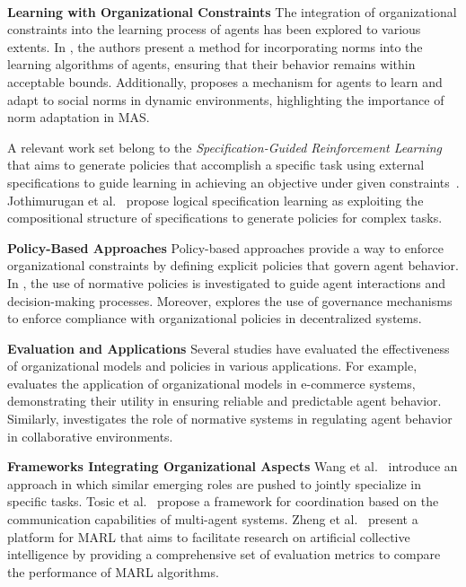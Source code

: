 \documentclass[conference]{IEEEtran}
\begin{document}
\

\textbf{Learning with Organizational Constraints} \quad
%
The integration of organizational constraints into the learning process of agents has been explored to various extents. In \cite{cruz2020norms}, the authors present a method for incorporating norms into the learning algorithms of agents, ensuring that their behavior remains within acceptable bounds. Additionally, \cite{villatoro2011social} proposes a mechanism for agents to learn and adapt to social norms in dynamic environments, highlighting the importance of norm adaptation in MAS.

A relevant work set belong to the \emph{Specification-Guided Reinforcement Learning} that aims to generate policies that accomplish a specific task using external specifications to guide learning in achieving an objective under given constraints~\cite{Bansal2022}. Jothimurugan et al.~\cite{Jothimurugan2021} propose logical specification learning as exploiting the compositional structure of specifications to generate policies for complex tasks.

\textbf{Policy-Based Approaches} \quad
%
Policy-based approaches provide a way to enforce organizational constraints by defining explicit policies that govern agent behavior. In \cite{krupanski2015norm}, the use of normative policies is investigated to guide agent interactions and decision-making processes. Moreover, \cite{vos2020governing} explores the use of governance mechanisms to enforce compliance with organizational policies in decentralized systems.

\textbf{Evaluation and Applications} \quad
%
Several studies have evaluated the effectiveness of organizational models and policies in various applications. For example, \cite{dignum2004agent} evaluates the application of organizational models in e-commerce systems, demonstrating their utility in ensuring reliable and predictable agent behavior. Similarly, \cite{andrighetto2013normative} investigates the role of normative systems in regulating agent behavior in collaborative environments.

\textbf{Frameworks Integrating Organizational Aspects} \quad
%
Wang et al.~\cite{Wang2020} introduce an approach in which similar emerging roles are pushed to jointly specialize in specific tasks. Tosic et al.~\cite{Tosic2010} propose a framework for coordination based on the communication capabilities of multi-agent systems. Zheng et al.~\cite{Zheng2018} present a platform for MARL that aims to facilitate research on artificial collective intelligence by providing a comprehensive set of evaluation metrics to compare the performance of MARL algorithms.
\end{document}
